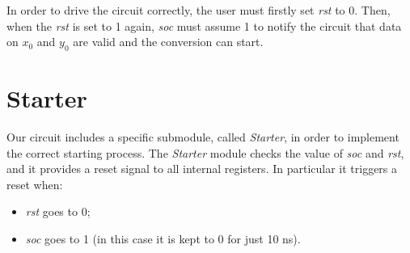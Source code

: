 \documentclass[12pt,a4paper]{report}
\begin{document}
In order to drive the circuit correctly, the user must firstly set \emph{rst} to 0. Then, when the \emph{rst} is set to 1 again, \emph{soc} must assume 1 to notify the circuit that data on $x_0$ and $y_0$ are valid and the conversion can start.

\section{Starter}
Our circuit includes a specific submodule, called \emph{Starter}, in order to implement the correct starting process. The \emph{Starter} module checks the value of \emph{soc} and \emph{rst}, and it provides a reset signal to all internal registers. In particular it triggers a reset when:

\begin{itemize}
	\item \emph{rst} goes to 0;
	\item \emph{soc} goes to 1 (in this case it is kept to 0 for just 10 ns).
\end{itemize}
\end{document}
